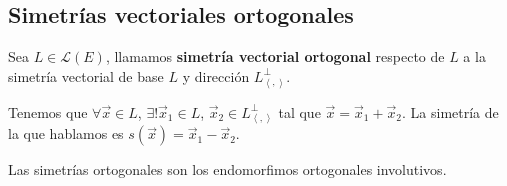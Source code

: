 \subsection{Simetrías vectoriales ortogonales}
\begin{fdefinition}
\normalfont Sea $\displaystyle L \in \mathcal{L}\left(E\right) $, llamamos \textbf{simetría vectorial ortogonal} respecto de $\displaystyle L $ a la simetría vectorial de base $\displaystyle L $ y dirección $\displaystyle L^{\perp }_{\left\langle ,  \right\rangle } $. 
\end{fdefinition}
\begin{observation}
\normalfont Tenemos que $\displaystyle \forall \vec{x} \in L $, $\displaystyle \exists! \vec{x}_{1} \in L $, $\displaystyle \vec{x}_{2} \in L^{\perp }_{\left\langle ,  \right\rangle } $ tal que $\displaystyle \vec{x} = \vec{x}_{1} + \vec{x}_{2} $. La simetría de la que hablamos es $\displaystyle s\left(\vec{x}\right) = \vec{x}_{1}-\vec{x}_{2} $.
\end{observation}
\begin{ftheorem}[]
\normalfont Las simetrías ortogonales son los endomorfimos ortogonales involutivos.
\end{ftheorem}
